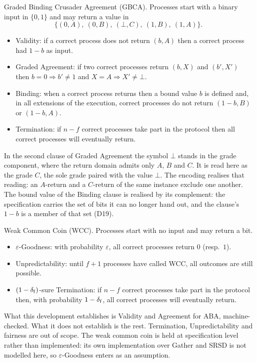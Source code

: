 Graded Binding Crusader Agreement (GBCA).
Processes start with a binary input in $\{0,1\}$ and may return a value in
\[
  \{(0,A),\ (0,B),\ (\bot,C),\ (1,B),\ (1,A)\}.
\]
\begin{itemize}
  \item Validity: if a correct process does not return $(b,A)$ then a correct
    process had $1-b$ as input.
  \item Graded Agreement: if two correct processes return $(b,X)$ and
    $(b',X')$ then $b = 0 \Rightarrow b' \neq 1$ and
    $X = A \Rightarrow X' \neq \bot$.
  \item Binding: when a correct process returns then a bound value $b$ is
    defined and, in all extensions of the execution, correct processes do not
    return $(1-b,B)$ or $(1-b,A)$.
  \item Termination: if $n-f$ correct processes take part in the protocol then
    all correct processes will eventually return.
\end{itemize}
In the second clause of Graded Agreement the symbol $\bot$ stands in the grade
component, where the return domain admits only $A$, $B$ and $C$.
It is read here as the grade $C$, the sole grade paired with the value $\bot$.
The encoding realises that reading: an $A$-return and a $C$-return of the same
instance exclude one another.
The bound value of the Binding clause is realised by its complement: the
specification carries the set of bits it can no longer hand out, and the
clause's $1-b$ is a member of that set (D19).

Weak Common Coin (WCC).
Processes start with no input and may return a bit.
\begin{itemize}
  \item $\varepsilon$-Goodness: with probability $\varepsilon$, all correct
    processes return $0$ (resp.\ $1$).
  \item Unpredictability: until $f+1$ processes have called WCC, all outcomes
    are still possible.
  \item $(1-\delta_{\mathrm{f}})$-sure Termination: if $n-f$ correct processes take part in
    the protocol then, with probability $1-\delta_{\mathrm{f}}$, all correct processes will
    eventually return.
\end{itemize}

What this development establishes is Validity and Agreement for ABA,
machine-checked.
What it does not establish is the rest.
Termination, Unpredictability and fairness are out of scope.
The weak common coin is held at specification level rather than implemented:
its own implementation over Gather and SRSD is not modelled here, so
$\varepsilon$-Goodness enters as an assumption.

